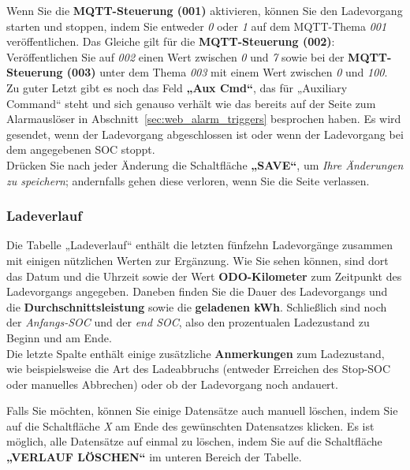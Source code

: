 Wenn Sie die \textbf{MQTT-Steuerung (001)} aktivieren, können Sie den Ladevorgang starten und stoppen,
indem Sie entweder \textit{0} oder \textit{1} auf dem MQTT-Thema \textit{001} veröffentlichen.
Das Gleiche gilt für die \textbf{MQTT-Steuerung (002)}: Veröffentlichen Sie auf \textit{002} einen Wert zwischen
\textit{0} und \textit{7} sowie bei der \textbf{MQTT-Steuerung (003)} unter dem Thema \textit{003} mit einem Wert
zwischen \textit{0} und \textit{100}.\\

Zu guter Letzt gibt es noch das Feld \textbf{„Aux Cmd“}, das für „Auxiliary
Command“ steht und sich genauso verhält wie das bereits auf der Seite zum Alarmauslöser in
Abschnitt~\ref{sec:web_alarm_triggers} besprochen haben. Es wird gesendet, wenn der Ladevorgang abgeschlossen ist oder
wenn der Ladevorgang bei dem angegebenen SOC stoppt.\\


Drücken Sie nach jeder Änderung die Schaltfläche \textbf{„SAVE“}, um \textit{Ihre Änderungen zu speichern}; andernfalls gehen diese verloren, wenn Sie die Seite verlassen.

\subsubsection{Ladeverlauf}

Die Tabelle „Ladeverlauf“ enthält die letzten fünfzehn Ladevorgänge zusammen mit einigen
nützlichen Werten zur Ergänzung. Wie Sie sehen können, sind dort das Datum und die Uhrzeit sowie
der Wert \textbf{ODO-Kilometer} zum Zeitpunkt des Ladevorgangs angegeben. Daneben finden Sie die
Dauer des Ladevorgangs und die \textbf{Durchschnittsleistung} sowie die \textbf{geladenen kWh}.
Schließlich sind noch der \textit{Anfangs-SOC} und der \textit{end SOC}, also den prozentualen Ladezustand zu Beginn und am Ende.\\


Die letzte Spalte enthält einige zusätzliche \textbf{Anmerkungen} zum Ladezustand, wie beispielsweise
die Art des Ladeabbruchs (entweder Erreichen des Stop-SOC oder manuelles Abbrechen) oder ob der Ladevorgang noch andauert.

Falls Sie möchten, können Sie einige Datensätze auch manuell löschen, indem Sie auf die Schaltfläche \textit{X}
am Ende des gewünschten Datensatzes klicken. Es ist möglich, alle Datensätze auf einmal zu löschen, indem Sie
auf die Schaltfläche \textbf{„VERLAUF LÖSCHEN“} im unteren Bereich der Tabelle.


